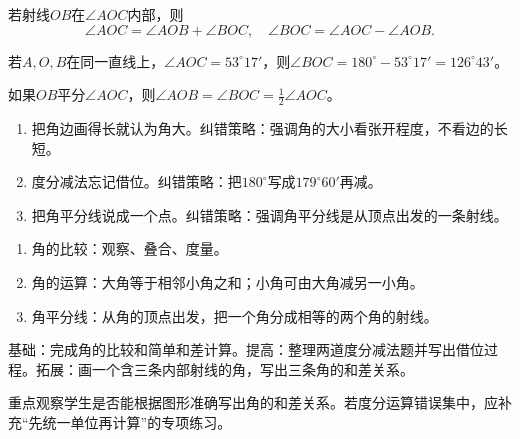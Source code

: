\documentclass[UTF8,a4paper,11pt]{ctexart}
\begin{document}
\begin{center}
\AngleSumFigure
\end{center}
若射线\(OB\)在\(\angle AOC\)内部，则
\[
\angle AOC=\angle AOB+\angle BOC,\quad
\angle BOC=\angle AOC-\angle AOB.
\]

\begin{center}
\StraightAngleFigure
\end{center}
若\(A,O,B\)在同一直线上，\(\angle AOC=53^\circ17'\)，则\(\angle BOC=180^\circ-53^\circ17'=126^\circ43'\)。

\begin{center}
\AngleBisectorFigure
\end{center}
如果\(OB\)平分\(\angle AOC\)，则\(\angle AOB=\angle BOC=\frac{1}{2}\angle AOC\)。

\begin{enumerate}
\item 把角边画得长就认为角大。纠错策略：强调角的大小看张开程度，不看边的长短。
\item 度分减法忘记借位。纠错策略：把\(180^\circ\)写成\(179^\circ60'\)再减。
\item 把角平分线说成一个点。纠错策略：强调角平分线是从顶点出发的一条射线。
\end{enumerate}


\begin{enumerate}
\item 角的比较：观察、叠合、度量。
\item 角的运算：大角等于相邻小角之和；小角可由大角减另一小角。
\item 角平分线：从角的顶点出发，把一个角分成相等的两个角的射线。
\end{enumerate}

基础：完成角的比较和简单和差计算。提高：整理两道度分减法题并写出借位过程。拓展：画一个含三条内部射线的角，写出三条角的和差关系。

重点观察学生是否能根据图形准确写出角的和差关系。若度分运算错误集中，应补充“先统一单位再计算”的专项练习。
\end{document}
